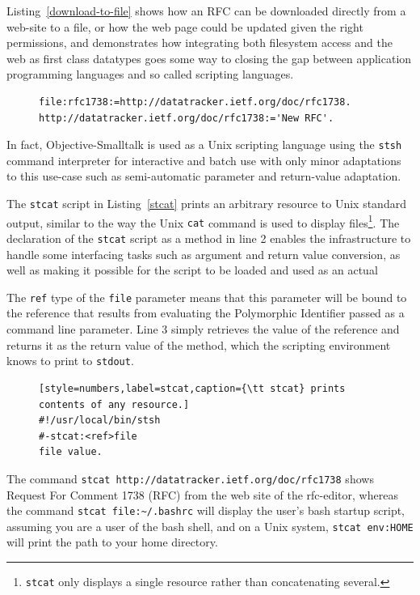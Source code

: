 \documentclass[preprint]{sigplanconf}
\begin{document}
Listing~\ref{download-to-file} shows how an RFC can be downloaded directly from a web-site
to a file, or how the web page could be updated given the right permissions, and demonstrates how integrating both filesystem access and the web as first class datatypes
goes some way to closing the gap between application programming languages and so called
scripting languages.

\begin{figure}[htbp]
\begin{lstlisting}[style=numbers,label=download-to-file,caption=Downloading an RFC to a file.]
file:rfc1738:=http://datatracker.ietf.org/doc/rfc1738.
http://datatracker.ietf.org/doc/rfc1738:='New RFC'.
\end{lstlisting}
\end{figure}

In fact,  Objective-Smalltalk is used as a Unix scripting language using the {\tt stsh} command
interpreter for interactive and batch use with only minor adaptations to this use-case such
as semi-automatic parameter and return-value adaptation.


The {\tt stcat} script in Listing~\ref{stcat} prints an arbitrary resource to Unix standard output, 
similar to the way the Unix {\tt cat} command is used to display files\footnote{{\tt stcat} only 
displays a single resource rather than concatenating several.}.
The declaration of the {\tt stcat} script as a method in line 2 enables the infrastructure to 
handle some interfacing tasks such as argument and return value conversion, as well
as making it possible for the script to be loaded and used as an actual 

The {\tt ref} type of the {\tt file} parameter means that this parameter will be bound to the
reference that results from evaluating the Polymorphic Identifier passed as a command
line parameter.    Line 3 simply retrieves the value of the reference and returns it as
the return value of the method, which the scripting environment knows to print to {\tt stdout}.


\begin{figure}[htbp]
\begin{lstlisting}[style=numbers,label=stcat,caption={\tt stcat} prints contents of any resource.]
#!/usr/local/bin/stsh
#-stcat:<ref>file
file value.
\end{lstlisting}
\end{figure}


The command  {\tt stcat http://datatracker.ietf.org/doc/rfc1738} shows \break \mbox{Request}
For Comment 1738 (RFC) from the web site of the rfc-editor, whereas 
the command {\tt stcat file:\~\//.bashrc} will display the user's bash startup script, assuming you are a user of the
bash shell, and on a Unix system, {\tt stcat env:HOME} will print the path to 
your home directory.
\fussy
\end{document}
